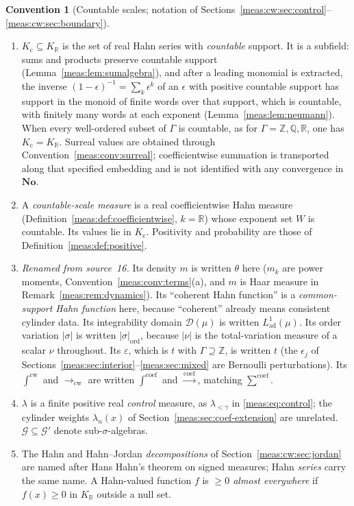 \documentclass[11pt]{article}
\numberwithin{equation}{section}
\theoremstyle{definition}
\newtheorem{convention}[theorem]{Convention}
\theoremstyle{remark}
\newcommand{\R}{\mathbb R}
\newcommand{\Q}{\mathbb Q}
\newcommand{\Z}{\mathbb Z}
\newcommand{\No}{\mathbf{No}}
\newcommand{\KR}{K_{\R}}
\newcommand{\csum}{\mathop{\sum}\nolimits^{\mathrm{coef}}}
\newcommand{\abs}[1]{\lvert#1\rvert}
\newcommand{\Kc}{K_{\mathrm c}}
\newcommand{\intc}{\mathop{\int}\nolimits^{\mathrm{coef}}}
\newcommand{\tocoef}{\xrightarrow{\mathrm{coef}}}
\newcommand{\Lad}{L^1_{\mathrm{ad}}}
\begin{document}
\begin{convention}[Countable scales; notation of
Sections~\ref{meas:cw:sec:control}--\ref{meas:cw:sec:boundary}]
\label{meas:cw:conv:notation}
\begin{enumerate}[label=(\alph*)]
\item $\Kc\subseteq\KR$ is the set of real Hahn series with \emph{countable}
support. It is a subfield: sums and products preserve countable support
(Lemma~\ref{meas:lem:sumalgebra}), and after a leading monomial is extracted,
the inverse $(1-\epsilon)^{-1}=\sum_k\epsilon^k$ of an $\epsilon$ with positive
countable support has support in the monoid of finite words over that support,
which is countable, with finitely many words at each exponent
(Lemma~\ref{meas:lem:neumann}). When every well-ordered subset of $\Gamma$ is
countable, as for $\Gamma=\Z,\Q,\R$, one has $\Kc=\KR$. Surreal values are
obtained through Convention~\ref{meas:conv:surreal}; coefficientwise summation is
transported along that specified embedding and is not identified with any
convergence in $\No$.
\item A \emph{countable-scale measure} is a real coefficientwise Hahn measure
(Definition~\ref{meas:def:coefficientwise}, $k=\R$) whose exponent set $W$ is
countable. Its values lie in $\Kc$. Positivity and probability are those of
Definition~\ref{meas:def:positive}.
\item \emph{Renamed from source~16.} Its density $m$ is written $\theta$ here
($m_k$ are power moments, Convention~\ref{meas:conv:terms}(a), and $m$ is Haar
measure in Remark~\ref{meas:rem:dynamics}). Its ``coherent Hahn function'' is a
\emph{common-support Hahn function} here, because ``coherent'' already means
consistent cylinder data. Its integrability domain $\mathcal D(\mu)$ is written
$\Lad(\mu)$. Its order variation $\abs\sigma$ is written $\abs\sigma_{\mathrm{ord}}$,
because $\abs\nu$ is the total-variation measure of a scalar $\nu$ throughout. Its
$\varepsilon$, which is $t$ with $\Gamma\supseteq\Z$, is written $t$ (the
$\epsilon_j$ of Sections~\ref{meas:sec:interior}--\ref{meas:sec:mixed} are
Bernoulli perturbations). Its $\int^{\mathrm{cw}}$ and $\to_{\mathrm{cw}}$ are
written $\intc$ and $\tocoef$, matching $\csum$.
\item $\lambda$ is a finite positive real \emph{control} measure, as
$\lambda_{<\gamma}$ in \eqref{meas:eq:control}; the cylinder weights
$\lambda_n(x)$ of Section~\ref{meas:sec:coef-extension} are unrelated.
$\mathcal G\subseteq\mathcal G'$ denote sub-$\sigma$-algebras.
\item The Hahn and Hahn--Jordan \emph{decompositions} of
Section~\ref{meas:cw:sec:jordan} are named after Hans Hahn's theorem on signed
measures; Hahn \emph{series} carry the same name. A Hahn-valued function $f$ is
\emph{$\ge0$ almost everywhere} if $f(x)\ge0$ in $\KR$ outside a null set.
\end{enumerate}
\end{convention}
\end{document}
